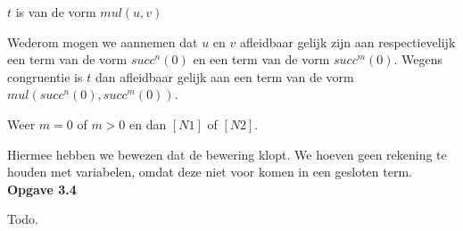 \documentclass[a4paper,11pt]{article}
\begin{document}
\begin{description}
\begin{description}
  \item{$t$ is van de vorm $mul(u, v)$}

    Wederom mogen we aannemen dat $u$ en $v$ afleidbaar gelijk zijn aan
    respectievelijk een term van de vorm $succ^{n}(0)$ en een term van de vorm
    $succ^{m}(0)$. Wegens congruentie is $t$ dan afleidbaar gelijk aan een
    term van de vorm $mul(succ^{n}(0), succ^{m}(0))$.

    Weer $m = 0$ of $m > 0$ en dan $[N1]$ of $[N2]$.

  \end{description}

\end{description}

Hiermee hebben we bewezen dat de bewering klopt. We hoeven geen rekening te
houden met variabelen, omdat deze niet voor komen in een gesloten term.\\[1em]


{\bf Opgave 3.4}

Todo.
\end{document}
